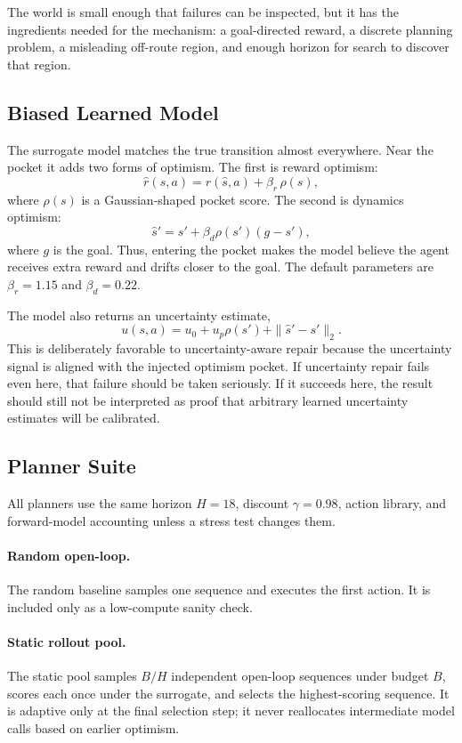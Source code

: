 \documentclass{article}
\begin{document}
The world is small enough that failures can be inspected, but it has the ingredients needed for the mechanism: a goal-directed reward, a discrete planning problem, a misleading off-route region, and enough horizon for search to discover that region.

\subsection{Biased Learned Model}

The surrogate model matches the true transition almost everywhere. Near the pocket it adds two forms of optimism. The first is reward optimism:
\[
\hat r(s,a) = r(\hat s,a) + \beta_r \, \rho(s),
\]
where \(\rho(s)\) is a Gaussian-shaped pocket score. The second is dynamics optimism:
\[
\hat s' = s' + \beta_d \rho(s') (g-s'),
\]
where \(g\) is the goal. Thus, entering the pocket makes the model believe the agent receives extra reward and drifts closer to the goal. The default parameters are \(\beta_r=1.15\) and \(\beta_d=0.22\).

The model also returns an uncertainty estimate,
\[
u(s,a)=u_0 + u_p \rho(s') + \|\hat s'-s'\|_2.
\]
This is deliberately favorable to uncertainty-aware repair because the uncertainty signal is aligned with the injected optimism pocket. If uncertainty repair fails even here, that failure should be taken seriously. If it succeeds here, the result should still not be interpreted as proof that arbitrary learned uncertainty estimates will be calibrated.

\subsection{Planner Suite}

All planners use the same horizon \(H=18\), discount \(\gamma=0.98\), action library, and forward-model accounting unless a stress test changes them.

\paragraph{Random open-loop.}
The random baseline samples one sequence and executes the first action. It is included only as a low-compute sanity check.

\paragraph{Static rollout pool.}
The static pool samples \(B/H\) independent open-loop sequences under budget \(B\), scores each once under the surrogate, and selects the highest-scoring sequence. It is adaptive only at the final selection step; it never reallocates intermediate model calls based on earlier optimism.
\end{document}
